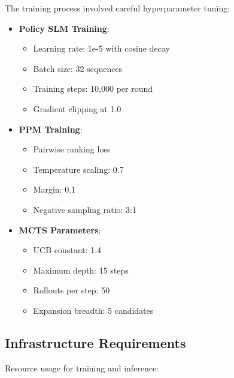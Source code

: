 The training process involved careful hyperparameter tuning:

\begin{itemize}
    \item \textbf{Policy SLM Training}:
    \begin{itemize}
        \item Learning rate: 1e-5 with cosine decay
        \item Batch size: 32 sequences
        \item Training steps: 10,000 per round
        \item Gradient clipping at 1.0
    \end{itemize}

    \item \textbf{PPM Training}:
    \begin{itemize}
        \item Pairwise ranking loss
        \item Temperature scaling: 0.7
        \item Margin: 0.1
        \item Negative sampling ratio: 3:1
    \end{itemize}

    \item \textbf{MCTS Parameters}:
    \begin{itemize}
        \item UCB constant: 1.4
        \item Maximum depth: 15 steps
        \item Rollouts per step: 50
        \item Expansion breadth: 5 candidates
    \end{itemize}
\end{itemize}

\subsection{Infrastructure Requirements}

Resource usage for training and inference:

